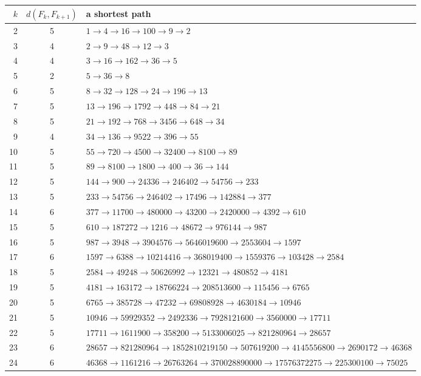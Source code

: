 {\footnotesize\begin{longtable}{@{}rcp{}@{}}\toprule
$k$ & $d(F_k,F_{k+1})$ & a shortest path\\\midrule\endhead
2 & 5 & $1 \to 4 \to 16 \to 100 \to 9 \to 2$ \\
3 & 4 & $2 \to 9 \to 48 \to 12 \to 3$ \\
4 & 4 & $3 \to 16 \to 162 \to 36 \to 5$ \\
5 & 2 & $5 \to 36 \to 8$ \\
6 & 5 & $8 \to 32 \to 128 \to 24 \to 196 \to 13$ \\
7 & 5 & $13 \to 196 \to 1792 \to 448 \to 84 \to 21$ \\
8 & 5 & $21 \to 192 \to 768 \to 3456 \to 648 \to 34$ \\
9 & 4 & $34 \to 136 \to 9522 \to 396 \to 55$ \\
10 & 5 & $55 \to 720 \to 4500 \to 32400 \to 8100 \to 89$ \\
11 & 5 & $89 \to 8100 \to 1800 \to 400 \to 36 \to 144$ \\
12 & 5 & $144 \to 900 \to 24336 \to 246402 \to 54756 \to 233$ \\
13 & 5 & $233 \to 54756 \to 246402 \to 17496 \to 142884 \to 377$ \\
14 & 6 & $377 \to 11700 \to 480000 \to 43200 \to 2420000 \to 4392 \to 610$ \\
15 & 5 & $610 \to 187272 \to 1216 \to 48672 \to 976144 \to 987$ \\
16 & 5 & $987 \to 3948 \to 3904576 \to 5646019600 \to 2553604 \to 1597$ \\
17 & 6 & $1597 \to 6388 \to 10214416 \to 368019400 \to 1559376 \to 103428 \to 2584$ \\
18 & 5 & $2584 \to 49248 \to 50626992 \to 12321 \to 480852 \to 4181$ \\
19 & 5 & $4181 \to 163172 \to 18766224 \to 208513600 \to 115456 \to 6765$ \\
20 & 5 & $6765 \to 385728 \to 47232 \to 69808928 \to 4630184 \to 10946$ \\
21 & 5 & $10946 \to 59929352 \to 2492336 \to 7928121600 \to 3560000 \to 17711$ \\
22 & 5 & $17711 \to 1611900 \to 358200 \to 5133006025 \to 821280964 \to 28657$ \\
23 & 6 & $28657 \to 821280964 \to 1852810219150 \to 507619200 \to 4145556800 \to 2690172 \to 46368$ \\
24 & 6 & $46368 \to 1161216 \to 26763264 \to 370028890000 \to 17576372275 \to 225300100 \to 75025$ \\

\end{longtable}}
